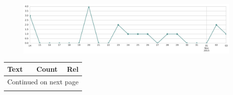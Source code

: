 \begin{figure}[htbp!]
    \centering
    \includegraphics[width=\textwidth]{twitter_murcia/report_images/topic-05-timeseries.jpg}
\end{figure}

\begin{longtable}{p{12.5cm}rr}
\toprule
Text & Count & Rel \\
\midrule
\endhead
\midrule
\multicolumn{3}{r}{{Continued on next page}} \\
\midrule
\endfoot


\end{longtable}
